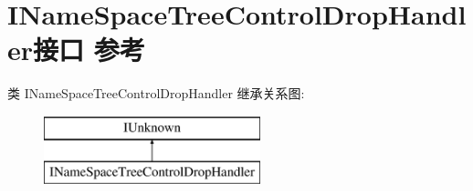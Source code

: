\hypertarget{interface_i_name_space_tree_control_drop_handler}{}\section{I\+Name\+Space\+Tree\+Control\+Drop\+Handler接口 参考}
\label{interface_i_name_space_tree_control_drop_handler}
类 I\+Name\+Space\+Tree\+Control\+Drop\+Handler 继承关系图\+:\begin{figure}[H]
\begin{center}
\leavevmode
\includegraphics[height=2.000000cm]{interface_i_name_space_tree_control_drop_handler}
\end{center}
\end{figure}
